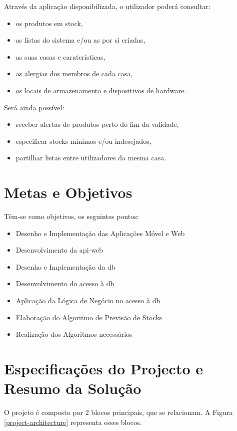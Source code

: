Através da aplicação disponibilizada, o utilizador poderá consultar:
\begin{itemize} \itemsep 0pt
	\item os produtos em stock,
	\item as listas do sistema e/ou as por si criadas,
	\item as suas casas e caraterísticas,
	\item as alergias dos membros de cada casa,
	\item os locais de armazenamento e dispositivos de hardware.
\end{itemize}

Será ainda possível:
\begin{itemize} \itemsep 0pt
	\item receber alertas de produtos perto do fim da validade,
	\item especificar stocks mínimos e/ou indesejados,
	\item partilhar listas entre utilizadores da mesma casa.
\end{itemize}

%
%
\section{Metas e Objetivos} \label{sec12}
Têm-se como objetivos, os seguintes pontos:
\begin{itemize} \itemsep 0pt
	\item Desenho e Implementação das Aplicações Móvel e Web
	\item Desenvolvimento da \gls{api-web}
	\item Desenho e Implementação da \acrshort{db}
	\item Desenvolvimento do acesso à \acrshort{db}
	\item Aplicação da Lógica de Negócio no acesso à \acrshort{db}
	\item Elaboração do Algoritmo de Previsão de Stocks
	\item Realização dos Algoritmos necessários
\end{itemize}


%
%
\section{Especificações do Projecto e Resumo da Solução} \label{sec13}

O projeto é composto por 2 blocos principais, que se relacionam. A Figura \ref{project-architecture} representa esses blocos. 

